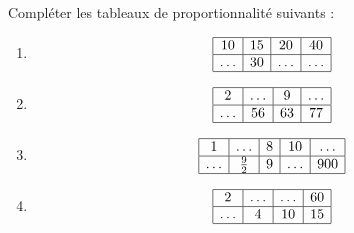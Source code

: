 
\begin{exercice}\label{exosmath-0945}

    Compléter les tableaux de proportionnalité suivants :
    \begin{multicols}{2}
    \begin{enumerate}
        \item
            \begin{equation*}
                \begin{array}[]{|c|c|c|c|}
                    \hline
                    10&15&20&40\\
                    \hline
                    \ldots&30&\ldots&\ldots\\
                    \hline
                \end{array}
            \end{equation*}
        \item
            \begin{equation*}
                \begin{array}[]{|c|c|c|c|}
                    \hline
                     2&\ldots&9&\ldots\\
                      \hline
                      \ldots&56&63&77\\ 
                      \hline 
                       \end{array}
                   \end{equation*}
               \item
                   \begin{equation*}
                       \begin{array}[]{|c|c|c|c|c|}
                           \hline
                           1&\ldots&8&10&\ldots\\
                           \hline
                           \ldots&\frac{ 9 }{2}&9&\ldots&900\\
                           \hline
                       \end{array}
                   \end{equation*}
                   \item
                       \begin{equation*}
                           \begin{array}[]{|c|c|c|c|}
                               \hline
                                2&\ldots&\ldots&60\\
                                 \hline
                                 \ldots&4&10&15\\ 
                                 \hline 
                                  \end{array}
                              \end{equation*}
    \end{enumerate}
    \end{multicols}

\end{exercice}
